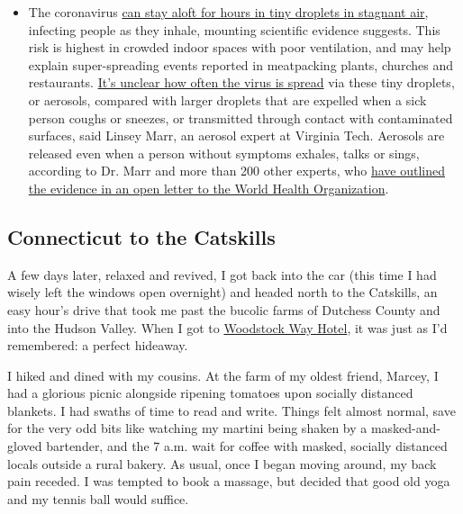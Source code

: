 \begin{itemize}
  \begin{itemize}
  \tightlist
  \item
    The coronavirus
    \href{https://www.nytimes.com/2020/07/04/health/239-experts-with-one-big-claim-the-coronavirus-is-airborne.html?action=click\&pgtype=Article\&state=default\&region=MAIN_CONTENT_3\&context=storylines_faq}{can
    stay aloft for hours in tiny droplets in stagnant air}, infecting
    people as they inhale, mounting scientific evidence suggests. This
    risk is highest in crowded indoor spaces with poor ventilation, and
    may help explain super-spreading events reported in meatpacking
    plants, churches and restaurants.
    \href{https://www.nytimes.com/2020/07/06/health/coronavirus-airborne-aerosols.html?action=click\&pgtype=Article\&state=default\&region=MAIN_CONTENT_3\&context=storylines_faq}{It's
    unclear how often the virus is spread} via these tiny droplets, or
    aerosols, compared with larger droplets that are expelled when a
    sick person coughs or sneezes, or transmitted through contact with
    contaminated surfaces, said Linsey Marr, an aerosol expert at
    Virginia Tech. Aerosols are released even when a person without
    symptoms exhales, talks or sings, according to Dr. Marr and more
    than 200 other experts, who
    \href{https://academic.oup.com/cid/article/doi/10.1093/cid/ciaa939/5867798}{have
    outlined the evidence in an open letter to the World Health
    Organization}.
  \end{itemize}
\end{itemize}

\hypertarget{connecticut-to-the-catskills}{%
\subsection{Connecticut to the
Catskills}\label{connecticut-to-the-catskills}}

A few days later, relaxed and revived, I got back into the car (this
time I had wisely left the windows open overnight) and headed north to
the Catskills, an easy hour's drive that took me past the bucolic farms
of Dutchess County and into the Hudson Valley. When I got to
\href{https://www.woodstockway.com/}{Woodstock Way Hotel}, it was just
as I'd remembered: a perfect hideaway.

I hiked and dined with my cousins. At the farm of my oldest friend,
Marcey, I had a glorious picnic alongside ripening tomatoes upon
socially distanced blankets. I had swaths of time to read and write.
Things felt almost normal, save for the very odd bits like watching my
martini being shaken by a masked-and-gloved bartender, and the 7 a.m.
wait for coffee with masked, socially distanced locals outside a rural
bakery. As usual, once I began moving around, my back pain receded. I
was tempted to book a massage, but decided that good old yoga and my
tennis ball would suffice.

